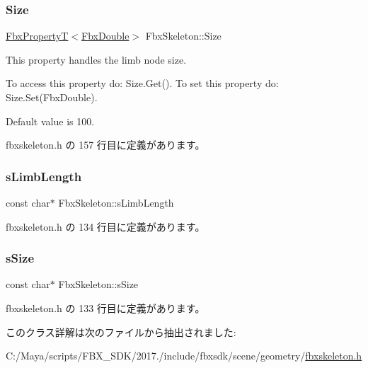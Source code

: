 \subsubsection{\texorpdfstring{Size}{Size}}
{\footnotesize\ttfamily \hyperlink{class_fbx_property_t}{Fbx\+PropertyT}$<$\hyperlink{fbxtypes_8h_a171e72a1c46fc15c1a6c9c31948c1c5b}{Fbx\+Double}$>$ Fbx\+Skeleton\+::\+Size}

This property handles the limb node size.

To access this property do\+: Size.\+Get(). To set this property do\+: Size.\+Set(\+Fbx\+Double).

Default value is 100. 

 fbxskeleton.\+h の 157 行目に定義があります。

\mbox{\label{class_fbx_skeleton_ac243ade080949dfcaa564d95e2f4aa6b}} 
\subsubsection{\texorpdfstring{s\+Limb\+Length}{sLimbLength}}
{\footnotesize\ttfamily const char$\ast$ Fbx\+Skeleton\+::s\+Limb\+Length\hspace{0.3cm}{\ttfamily [static]}}



 fbxskeleton.\+h の 134 行目に定義があります。

\mbox{\label{class_fbx_skeleton_a311e444376931fb3c3b0ce1b7444eddb}} 
\subsubsection{\texorpdfstring{s\+Size}{sSize}}
{\footnotesize\ttfamily const char$\ast$ Fbx\+Skeleton\+::s\+Size\hspace{0.3cm}{\ttfamily [static]}}



 fbxskeleton.\+h の 133 行目に定義があります。



このクラス詳解は次のファイルから抽出されました\+:\begin{DoxyCompactItemize}
\item 
C\+:/\+Maya/scripts/\+F\+B\+X\+\_\+\+S\+D\+K/2017./include/fbxsdk/scene/geometry/\hyperlink{fbxskeleton_8h}{fbxskeleton.\+h}\end{DoxyCompactItemize}

